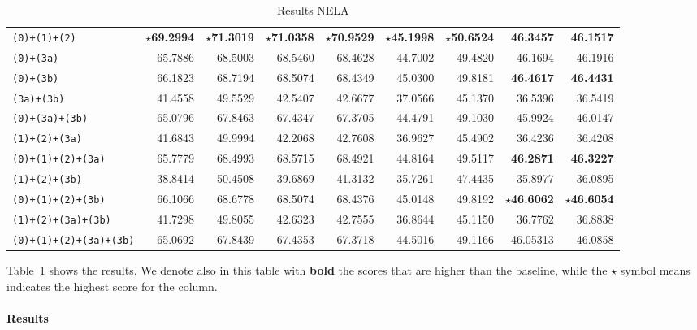 \begin{table}[!htbp]
{\begin{tabular}{l|rr|rr|rr|rr}
        \texttt{(0)+(1)+(2)} & \textbf{$\star$69.2994} & \textbf{$\star$71.3019} & \textbf{$\star$71.0358} & \textbf{$\star$70.9529} & \textbf{$\star$45.1998} & \textbf{$\star$50.6524} & \textbf{46.3457} & \textbf{46.1517} \\
        \texttt{(0)+(3a)} & 65.7886 & 68.5003 & 68.5460 & 68.4628 & 44.7002 & 49.4820 & 46.1694 & 46.1916 \\
        \texttt{(0)+(3b)} & 66.1823 & 68.7194 & 68.5074 & 68.4349 & 45.0300 & 49.8181 & \textbf{46.4617} & \textbf{46.4431} \\
        \texttt{(3a)+(3b)} & 41.4558 & 49.5529 & 42.5407 & 42.6677 & 37.0566 & 45.1370 & 36.5396 & 36.5419 \\
        \texttt{(0)+(3a)+(3b)} & 65.0796 & 67.8463 & 67.4347 & 67.3705 & 44.4791 & 49.1030 & 45.9924 & 46.0147  \\
        \texttt{(1)+(2)+(3a)} & 41.6843 & 49.9994 & 42.2068 & 42.7608 & 36.9627 & 45.4902 & 36.4236 & 36.4208   \\
        \texttt{(0)+(1)+(2)+(3a)} & 65.7779 & 68.4993 & 68.5715 & 68.4921 & 44.8164 & 49.5117 & \textbf{46.2871} & \textbf{46.3227}  \\
        \texttt{(1)+(2)+(3b)} & 38.8414 & 50.4508 & 39.6869 & 41.3132 & 35.7261 & 47.4435 & 35.8977 & 36.0895  \\
        \texttt{(0)+(1)+(2)+(3b)} & 66.1066 & 68.6778 & 68.5074 & 68.4376 & 45.0148 & 49.8192 & \textbf{$\star$46.6062} & \textbf{$\star$46.6054} \\
        \texttt{(1)+(2)+(3a)+(3b)} & 41.7298 & 49.8055 & 42.6323 & 42.7555 & 36.8644 & 45.1150 & 36.7762 & 36.8838 \\
        \texttt{(0)+(1)+(2)+(3a)+(3b)} & 65.0692 & 67.8439 & 67.4353 & 67.3718 & 44.5016 & 49.1166 & 46.05313 & 46.0858  \\
        
    \end{tabular}
    }
    \caption{Results NELA}
    \label{tab:results_prop_features_classifier_nela}
\end{table}

Table~\ref{tab:results_prop_features_classifier_nela} shows the results. We denote also in this table with \textbf{bold} the scores that are higher than the baseline, while the $\star$ symbol means indicates the highest score for the column.

\paragraph{Results}

